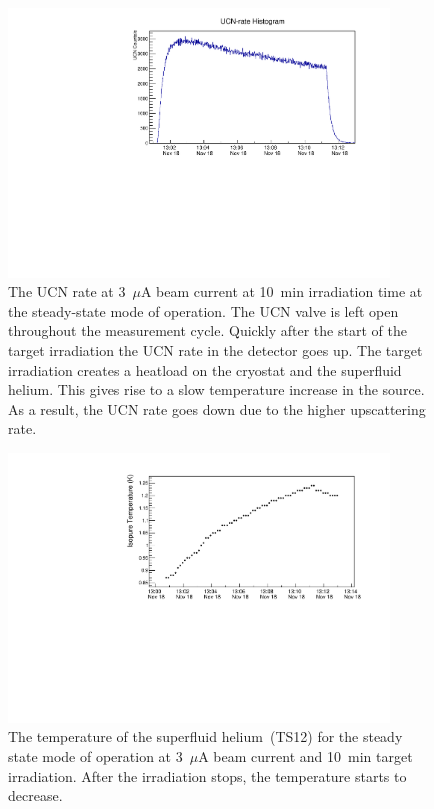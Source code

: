 \begin{figure}[h!]
  \centering
  \includegraphics[width=0.9\textwidth]{654_UCNRate.pdf}
  \caption[Steady-state UCN rate at 3~$\mu$A beam current]{The UCN
    rate at 3~$\mu$A beam current at 10~min irradiation time at the
    steady-state mode of operation. The UCN valve is left open
    throughout the measurement cycle. Quickly after the start of the
    target irradiation the UCN rate in the detector goes up. The
    target irradiation creates a heatload on the cryostat and the
    superfluid helium. This gives rise to a slow temperature increase
    in the source. As a result, the UCN rate goes down due to the
    higher upscattering rate.  }
  \label{fig:UCNRate_steadystate_highbeam}
\end{figure}

\begin{figure}[h!]
  \centering
  \includegraphics[width=0.9\textwidth]{UCNRate_temp.pdf}
  \caption[Superfluid helium temperature at 3~$\mu$A beam
  current~(steady-state mode)]{The temperature of the superfluid
    helium~(TS12) for the steady state mode of operation at 3~$\mu$A
    beam current and 10~min target irradiation. After the irradiation
    stops, the temperature starts to decrease. }
  \label{fig:UCNRate_temp}
\end{figure}


